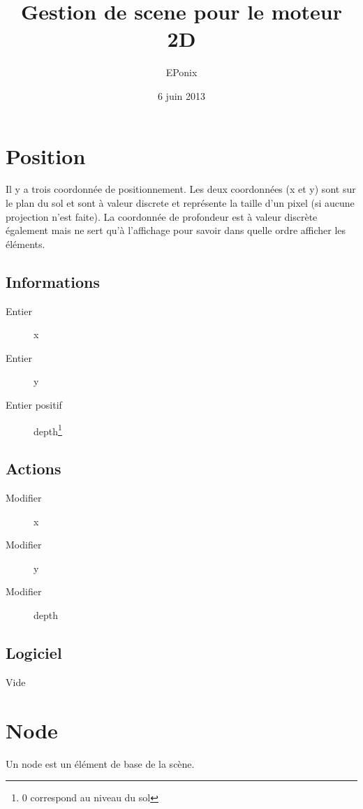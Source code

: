 \documentclass[11pt, a4paper]{article}
\begin{document}
\title{Gestion de scene pour le moteur 2D}
\author{EPonix}
\date{6 juin 2013}

\maketitle

\tableofcontents
\newpage

\section{Position}
Il y a trois coordonnée de positionnement.
Les deux coordonnées (x et y) sont sur le plan du sol et sont à valeur discrete et représente la taille d'un pixel (si aucune projection n'est faite).
La coordonnée de profondeur est à valeur discrète également mais ne sert qu'à l'affichage pour savoir dans quelle ordre afficher les éléments.

\subsection{Informations}
\begin{description}
\item[Entier] x
\item[Entier] y
\item[Entier positif] depth\footnote{0 correspond au niveau du sol}
\end{description}

\subsection{Actions}
\begin{description}
\item[Modifier] x
\item[Modifier] y
\item[Modifier] depth
\end{description}

\subsection{Logiciel}
Vide

\section{Node}
Un node est un élément de base de la scène.
\end{document}
